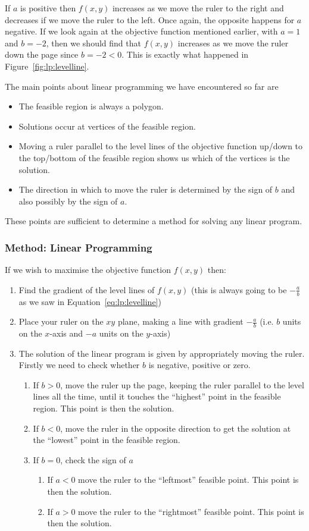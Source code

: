 If $a$ is positive then $f(x,y)$ increases as we move the ruler to the right and decreases if we move the ruler to the left. Once again, the opposite happens for $a$ negative. If we look again at the objective function mentioned earlier,
with $a=1$ and $b=-2$, then we should find that $f(x,y)$ increases as we move the ruler down the page since $b=-2<0$. This is exactly what happened in Figure~\ref{fig:lp:levelline}.

The main points about linear programming we have encountered so far are
\begin{itemize}
\item The feasible region is always a polygon.
\item Solutions occur at vertices of the feasible region.
\item Moving a ruler parallel to the level lines of the objective function up/down to the top/bottom of the feasible region shows us which of the vertices is the solution.
\item The direction in which to move the ruler is determined by the sign of $b$ and also possibly by the sign of $a$.
\end{itemize}

These points are sufficient to determine a method for solving any linear program. 

\subsubsection{Method: Linear Programming}
If we wish to maximise the objective function $f(x,y)$ then:
\begin{enumerate}
\item Find the gradient of the level lines of $f(x,y)$ (this is always going to be $-\frac{a}{b}$ as we saw in Equation~\ref{eq:lp:levelline})
\item Place your ruler on the $xy$ plane, making a line with gradient $-\frac{a}{b}$ (i.e. $b$ units on the $x$-axis and $-a$ units on the $y$-axis)
\item The solution of the linear program is given by appropriately moving the ruler. Firstly we need to check whether $b$ is negative, positive or zero.
\begin{enumerate}
\item If $b>0$, move the ruler up the page, keeping the ruler parallel to the level lines all the time, until it touches the ``highest'' point in the feasible region. This point is then the solution.
\item If $b<0$, move the ruler in the opposite direction to get the solution at the ``lowest'' point in the feasible region.
\item If $b=0$, check the sign of $a$
\begin{enumerate}
\item If $a<0$ move the ruler to the ``leftmost'' feasible point. This point is then the solution.
\item If $a>0$ move the ruler to the ``rightmost'' feasible point. This point is then the solution.
\end{enumerate}
\end{enumerate}
\end{enumerate}

